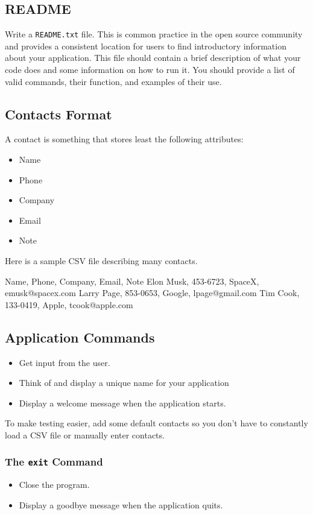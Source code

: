 \documentclass[11pt]{cselabheader}
\begin{document}
\subsection{README}
Write a \texttt{README.txt} file. This is common practice in the open
source community and provides a consistent location for users to find
introductory information about your application. This file should
contain a brief description of what your code does and some
information on how to run it.  You should provide a list of valid
commands, their function, and examples of their use.

\subsection{Contacts Format}
A contact is something that stores least the following attributes:
\begin{itemize}
\item Name
\item Phone
\item Company
\item Email
\item Note
\end{itemize}

Here is a sample CSV file describing many contacts.

\begin{verbatimcode}
Name, Phone, Company, Email, Note
Elon Musk, 453-6723, SpaceX, emusk@spacex.com
Larry Page, 853-0653, Google, lpage@gmail.com
Tim Cook, 133-0419, Apple, tcook@apple.com
\end{verbatimcode}

\subsection{Application Commands}
\begin{itemize}
\item Get input from the user.
\item Think of and display a unique name for your application
\item Display a welcome message when the application starts.
\end{itemize}
To make testing easier, add some default contacts so you don't have to
constantly load a CSV file or manually enter contacts.

\subsubsection{The \texttt{exit} Command}
\begin{itemize}
\item Close the program.
\item Display a goodbye message when the application quits.
\end{itemize}
\end{document}
